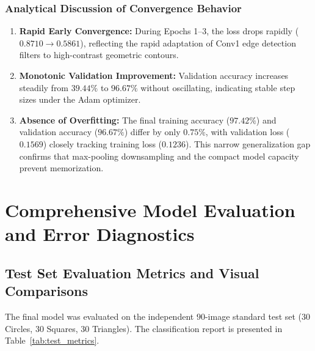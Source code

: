 \documentclass[11pt,a4paper,oneside]{report}
\begin{document}
\subsection{Analytical Discussion of Convergence Behavior}
\begin{enumerate}[leftmargin=*]
    \item \textbf{Rapid Early Convergence:} During Epochs 1--3, the loss drops rapidly ($0.8710 \to 0.5861$), reflecting the rapid adaptation of Conv1 edge detection filters to high-contrast geometric contours.
    \item \textbf{Monotonic Validation Improvement:} Validation accuracy increases steadily from $39.44\%$ to $96.67\%$ without oscillating, indicating stable step sizes under the Adam optimizer.
    \item \textbf{Absence of Overfitting:} The final training accuracy ($97.42\%$) and validation accuracy ($96.67\%$) differ by only $0.75\%$, with validation loss ($0.1569$) closely tracking training loss ($0.1236$). This narrow generalization gap confirms that max-pooling downsampling and the compact model capacity prevent memorization.
\end{enumerate}

\chapter{Comprehensive Model Evaluation and Error Diagnostics}

\section{Test Set Evaluation Metrics and Visual Comparisons}
The final model was evaluated on the independent $90$-image standard test set ($30$ Circles, $30$ Squares, $30$ Triangles). The classification report is presented in Table~\ref{tab:test_metrics}.
\end{document}
